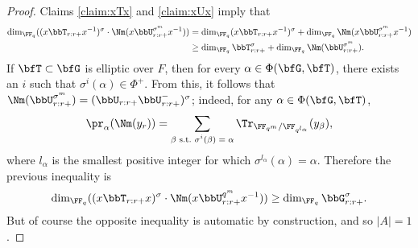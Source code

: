 \begin{proof}
  Claims \ref{claim:xTx} and \ref{claim:xUx} imply that
  \begin{align*}
    \dim_{\FF_q} ((x\bbT_{r:r+} x^{-1})^\sigma \cdot \Nm(x\bbU_{r:r+}^{\sigma^m} x^{-1})) 
    &= \dim_{\FF_q}(x\bbT_{r:r+} x^{-1})^\sigma + \dim_{\FF_q} \Nm(x\bbU_{r:r+}^{\sigma^m} x^{-1}) \\
    &\geq \dim_{\FF_q} \bbT_{r:r+}^\sigma + \dim_{\FF_q} \Nm(\bbU_{r:r+}^{\sigma^m}).
  \end{align*}
  If $\bfT \subset \bfG$ is elliptic over $F$, then for every $\alpha \in \Phi(\bfG,\bfT)$, there exists an $i$ such that $\sigma^i(\alpha) \in \Phi^+$. From this, it follows that $\Nm(\bbU_{r:r+}^{\sigma^m}) = (\bbU_{r:r+} \bbU_{r:r+}^-)^\sigma$; indeed, for any $\alpha \in \Phi(\bfG,\bfT)$, 
  \begin{equation*}
    \pr_\alpha(\Nm(y_r)) = \sum_{\text{$\beta$ s.t.\ $\sigma^i(\beta) = \alpha$}} \Tr_{\FF_{q^m}/\FF_{q^{l_\alpha}}}(y_\beta),
  \end{equation*} 
  where $l_\alpha$ is the smallest positive integer for which $\sigma^{l_\alpha}(\alpha) = \alpha$. Therefore the previous inequality is
  \begin{equation*}
    \dim_{\FF_q}((x\bbT_{r:r+} x)^\sigma \cdot \Nm(x \bbU_{r:r+}^{q^m} x^{-1})) \geq \dim_{\FF_q}\bbG_{r:r+}^\sigma.
  \end{equation*}
  But of course the opposite inequality is automatic by construction, and so $|A| = 1$.
\end{proof}


